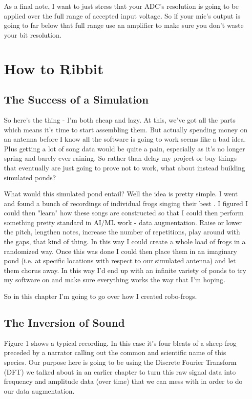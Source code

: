 \documentclass[10pt,a5paper]{book}
\begin{document}
As a final note, I want to just stress that your ADC's resolution is going to be applied over the full range of accepted input voltage. So if your mic's output is going to far below that full range use an amplifier to make sure you don't waste your bit resolution. 


\chapter{How to Ribbit}

\section{The Success of a Simulation}
So here's the thing - I'm both cheap and lazy. At this, we've got all the parts which means it's time to start assembling them. But actually spending money on an antenna before I know all the software is going to work seems like a bad idea. Plus getting a lot of song data would be quite a pain, especially as it's no longer spring and barely ever raining. So rather than delay my project or buy things that eventually are just going to prove not to work, what about instead building simulated ponds?

What would this simulated pond entail? Well the idea is pretty simple. I went and found a bunch of recordings of individual frogs singing their best \cite{songs}. I figured I could then "learn" how these songs are constructed so that I could then perform something pretty standard in AI/ML work - data augmentation. Raise or lower the pitch, lengthen notes, increase the number of repetitions, play around with the gaps, that kind of thing. In this way I could create a whole load of frogs in a randomized way. Once this was done I could then place them in an imaginary pond (i.e. at specific locations with respect to our simulated antenna) and let them chorus away. In this way I'd end up with an infinite variety of ponds to try my software on and make sure everything works the way that I'm hoping. 

So in this chapter I'm going to go over how I created robo-frogs. 
\section{The Inversion of Sound}

Figure 1 shows a typical recording. In this case it's four bleats of a sheep frog preceded by a narrator calling out the common and scientific name of this species. Our purpose here is going to be using the Discrete Fourier Transform (DFT) we talked about in an earlier chapter to turn this raw signal data into frequency and amplitude data (over time) that we can mess with in order to do our data augmentation. 
\end{document}
